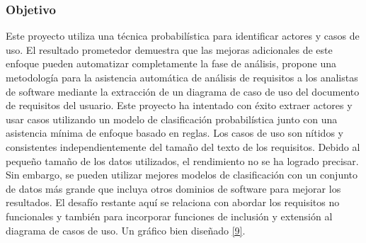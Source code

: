 \subsubsection{Objetivo}
Este proyecto utiliza una técnica probabilística para identificar actores y casos de uso. El resultado prometedor demuestra que las mejoras adicionales de este enfoque pueden automatizar completamente la fase de análisis, propone una metodología para la asistencia automática de análisis de requisitos a los analistas de software mediante la extracción de un diagrama de caso de uso del documento de requisitos del usuario.
Este proyecto ha intentado con éxito extraer actores y usar casos utilizando un modelo de clasificación probabilística junto con una asistencia mínima de enfoque basado en reglas. Los casos de uso son nítidos y consistentes independientemente del tamaño del texto de los requisitos. Debido al pequeño tamaño de los datos utilizados, el rendimiento no se ha logrado precisar. Sin embargo, se pueden utilizar mejores modelos de clasificación con un conjunto de datos más grande que incluya otros dominios de software para mejorar los resultados. El desafío restante aquí se relaciona con abordar los requisitos no funcionales y también para incorporar funciones de inclusión y extensión al diagrama de casos de uso. Un gráfico bien diseñado \hyperlink{b09}{[9]}.

%
%